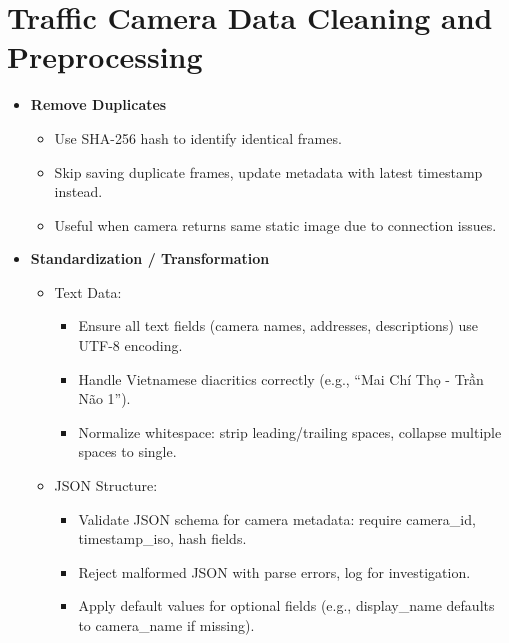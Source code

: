 \section{Traffic Camera Data Cleaning and Preprocessing} 
\begin{itemize}
\item \textbf{Remove Duplicates} 
\begin{itemize}
    \item Use SHA-256 hash to identify identical frames.
    \item Skip saving duplicate frames, update metadata with latest timestamp instead.
    \item Useful when camera returns same static image due to connection issues.
\end{itemize}

\item \textbf{Standardization / Transformation}
\begin{itemize}
\item Text Data:
\begin{itemize}
\item Ensure all text fields (camera names, addresses, descriptions) use UTF-8 encoding.
\item Handle Vietnamese diacritics correctly (e.g., “Mai Chí Thọ - Trần Não 1”).
\item Normalize whitespace: strip leading/trailing spaces, collapse multiple spaces to single.
\end{itemize}
\item JSON Structure:
\begin{itemize}
\item Validate JSON schema for camera metadata: require camera\_id, timestamp\_iso, hash fields.
\item Reject malformed JSON with parse errors, log for investigation.
\item Apply default values for optional fields (e.g., display\_name defaults to camera\_name if missing).
\end{itemize}
\end{itemize}
\end{itemize}





